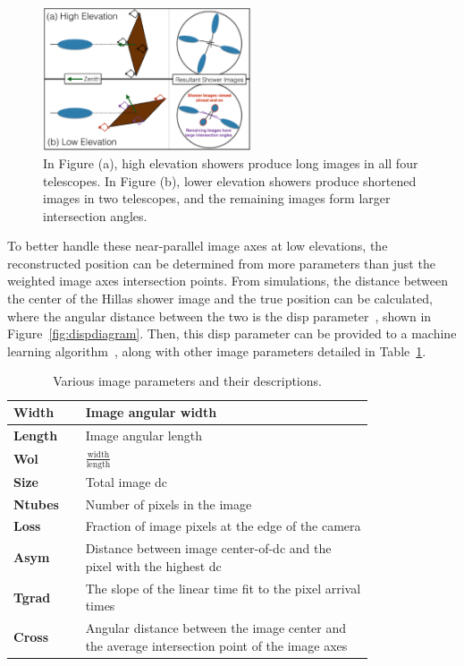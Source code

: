 \begin{figure}[bt]
  \centering
  \includegraphics[width=0.55\textwidth]{images/high_elevation_vs_low_shower_images_cropped.eps}
  \caption[Shower Images at High and Low Elevations]{
    In Figure (a), high elevation showers produce long images in all four telescopes.
    In Figure (b), lower elevation showers produce shortened images in two telescopes, and the remaining images form larger intersection angles.
  }
  \label{fig:showerhighlowelev}
\end{figure}

To better handle these near-parallel image axes at low elevations, the reconstructed position can be determined from more parameters than just the weighted image axes intersection points.
From simulations, the distance between the center of the Hillas shower image and the true position can be calculated, where the angular distance between the two is the disp parameter~\cite{Senturk:2011}, shown in Figure~\ref{fig:dispdiagram}.
Then, this disp parameter can be provided to a machine learning algorithm~\cite{Beilicke2012NIM}, along with other image parameters detailed in Table~\ref{tab:imageparams}.

\begin{table}[h]
  \centering
  \caption[Shower Image Parameters]{
    Various image parameters and their descriptions.
  }
  \label{tab:imageparams}
  \begin{tabular}{|l|p{0.8\linewidth}|}
    \hline
    \textbf{Width}  & Image angular width  \\ \hline
    \textbf{Length} & Image angular length  \\ \hline
    \textbf{Wol}    & $\frac{\textrm{width}}{\textrm{length}}$  \\ \hline
    \textbf{Size}   & Total image dc \\ \hline
    \textbf{Ntubes} & Number of pixels in the image \\ \hline
    \textbf{Loss}   & Fraction of image pixels at the edge of the camera \\ \hline
    \textbf{Asym}   & Distance between image center-of-dc and the pixel with the highest dc \\ \hline
    \textbf{Tgrad}  & The slope of the linear time fit to the pixel arrival times \\ \hline
    \textbf{Cross}  & Angular distance between the image center and the average intersection point of the image axes \\ \hline
  \end{tabular}
\end{table}



